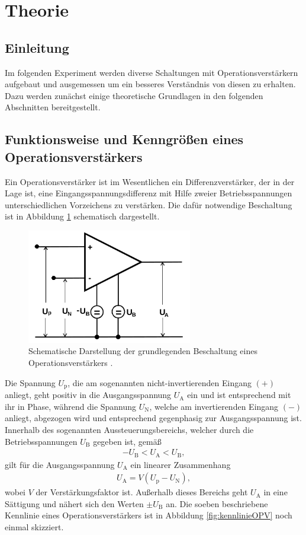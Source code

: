 \section{Theorie}
\label{sec:Theorie}

\subsection{Einleitung}

Im folgenden Experiment werden diverse Schaltungen mit Operationsverstärkern
aufgebaut und ausgemessen um ein besseres Verständnis von diesen zu erhalten.
Dazu werden zunächst einige theoretische Grundlagen in den folgenden Abschnitten
bereitgestellt.

\subsection{Funktionsweise und Kenngrößen eines Operationsverstärkers}

Ein Operationsverstärker ist im Wesentlichen ein Differenzverstärker, der in der Lage ist, eine Eingangsspannungsdifferenz
mit Hilfe zweier Betriebsspannungen unterschiedlichen Vorzeichens zu verstärken.
Die dafür notwendige Beschaltung ist in Abbildung \ref{fig:OPVGrund} schematisch dargestellt.

\begin{figure}
  \centering
  \includegraphics[height=5cm]{ImmerDieseNorweger/OPVGrund.png}
  \caption{Schematische Darstellung der grundlegenden Beschaltung eines Operationsverstärkers \cite{anleitung}.}
  \label{fig:OPVGrund}
\end{figure}

Die Spannung $U_\text{p}$, die am sogenannten nicht-invertierenden Eingang $(+)$ anliegt, geht positiv
in die Ausgangsspannung $U_\text{A}$ ein und ist entsprechend mit ihr in Phase, während die Spannung $U_\text{N}$,
welche am invertierenden Eingang $(-)$ anliegt, abgezogen wird und entsprechend gegenphasig zur Ausgangsspannung ist.
Innerhalb des sogenannten Aussteuerungsbereichs, welcher durch die Betriebsspannungen $U_\text{B}$ gegeben ist, gemäß
\begin{align}
  -U_\text{B} < U_\text{A} < U_\text{B},
\end{align}
gilt für die Ausgangsspannung $U_\text{A}$ ein linearer Zusammenhang
\begin{align}
  U_\text{A} = V \left( U_\text{p} - U_\text{N} \right),
\end{align}
wobei $V$ der Verstärkungsfaktor ist. Außerhalb dieses Bereichs geht $U_\text{A}$ in eine
Sättigung und nähert sich den Werten $\pm U_\text{B}$ an.
Die soeben beschriebene Kennlinie eines Operationsverstärkers ist in Abbildung \ref{fig:kennlinieOPV}
noch einmal skizziert.

